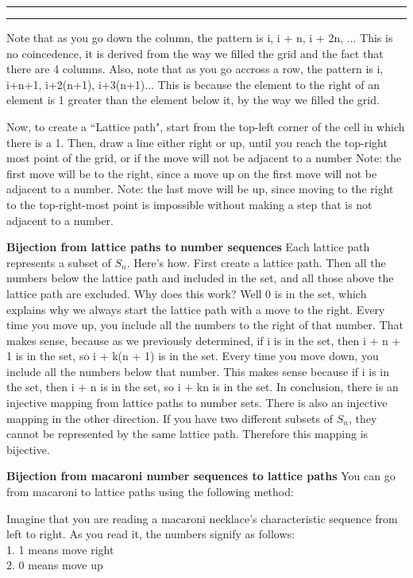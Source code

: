 \documentclass[11pt]{article}
\newcounter{questionCounter}
\newcounter{partCounter}[questionCounter]
\newenvironment{question}[2][\arabic{questionCounter}]{%
    \setcounter{partCounter}{0}%
    \vspace{.25in} \hrule \vspace{0.5em}%
        \noindent{\bf #2}%
    \vspace{0.8em} \hrule \vspace{.10in}%
    \addtocounter{questionCounter}{1}%
}{}
\begin{document}
\begin{question}{Macaroni Revisited}
Note that as you go down the column, the pattern is i, i + n, i + 2n, ... This 
is no coincedence, it is derived from the way we filled the grid and the fact that
there are 4 columns. Also, note that as you go accross a row, the pattern is i, 
i+n+1, i+2(n+1), i+3(n+1)... This is because the element to the right of an element
is 1 greater than the element below it, by the way we filled the grid.

Now, to create a ``Lattice path", start from the top-left corner of the cell
in which there is a 1. Then, draw a line either right or up, until you reach the
top-right most point of the grid, or if the move will not be adjacent to a number
Note: the first move
will be to the right, since a move up on the first move will not be adjacent to a number.
Note: the
last move will be up, since moving to the right to the top-right-most point is impossible
without making a step that is not adjacent to a number.

\textbf{Bijection from lattice paths to number sequences}
Each lattice path represents a subset of $S_n$. Here's how. First create a lattice
path. Then all the numbers below the lattice path and included in the set, and all
those above the lattice path are excluded. Why does this work? Well 0 is in the set,
which explains why we always start the lattice path with a move to the right.
Every time you move up, you include all the numbers to the right of that number. 
That makes sense, because as we previously determined, if i is in the set, then 
i + n + 1 is in the set, so i + k(n + 1) is in the set. Every time you move down, 
you include all the numbers below that number. This makes sense because if i is 
in the set, then i + n is in the set, so i + kn is in the set. In conclusion,
there is an injective mapping from lattice paths to number sets. There is also an injective mapping in the other direction. If you have two different
subsets of $S_n$, they cannot be represented by the same lattice path. Therefore this mapping 
is bijective.

\textbf{Bijection from macaroni number sequences to lattice paths}
You can go from macaroni to lattice paths using the following method:

Imagine that you are reading a macaroni necklace's characteristic sequence from left
to right. As you read it, the numbers signify as follows:\\
1. 1 means move right\\
2. 0 means move up\\


\end{question}
\end{document}

